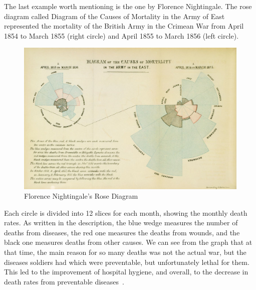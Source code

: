 The last example worth mentioning is the one by Florence Nightingale. The rose diagram called Diagram of the Causes of
Mortality in the Army of East represented the mortality of the British Army in the Crimean War from April 1854 to March 1855
(right circle) and April 1855 to March 1856 (left circle).

\begin{figure}[hbt!]
    \begin{center}
        \includegraphics[width=\textwidth]{graphics/2-literature-review/4}
    \end{center}
    \caption{Florence Nightingale's Rose Diagram~\citep{nightingale1858notes}}
    \label{fig:figure2.4}
\end{figure}

Each circle is divided into 12 slices for each month, showing the monthly death rates. As written in the
description, the blue wedge measures the number of deaths from diseases, the red one measures the deaths from wounds,
and the black one measures deaths from other causes. We can see from the graph that at that time, the main reason for so many deaths
was not the actual war, but the diseases soldiers had which were preventable, but unfortunately lethal for them. This
led to the improvement of hospital hygiene, and overall, to the decrease in death rates from preventable diseases~\citep{nightingale1859notes}.
